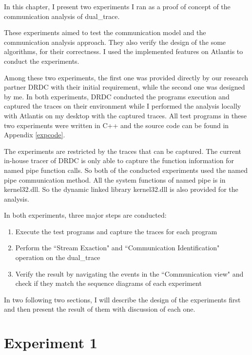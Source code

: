 


\label{chapter:Exp}
In this chapter, I present two experiments I ran as a proof of concept of the communication analysis of dual\_trace.

These experiments aimed to test the communication model and the communication analysis approach. They also verify the design of the some algorithms, for their correctness. I used the implemented features on Atlantis to conduct the experiments.

Among these two experiments, the first one was provided directly by our research partner DRDC with their initial requirement, while the second one was designed by me. In both experiments, DRDC conducted the programs execution and captured the traces on their environment while I performed the analysis locally with Atlantis on my desktop with the captured traces. All test programs in these two experiments were written in C++ and the source code can be found in Appendix \ref{expcode}. 

The experiments are restricted by the traces that can
be captured.  The current in-house tracer of DRDC is only able to capture the function information for named pipe function calls. So both of the conducted experiments used the named pipe communication method. All the system functions of named pipe is in kernel32.dll. So the dynamic linked library kernel32.dll is also provided for the analysis.

In both experiments, three major steps are conducted:
\begin{enumerate}
\item Execute the test programs and capture the traces for each program

\item Perform the ``Stream Exaction" and ``Communication Identification" operation on the dual\_trace

\item Verify the result by navigating the events in the ``Communication view" and check if they match the sequence diagrams of each experiment
\end{enumerate}

In two following two sections, I will describe the design of the experiments first and then present the result of them with discussion of each one.

\section{Experiment 1}
